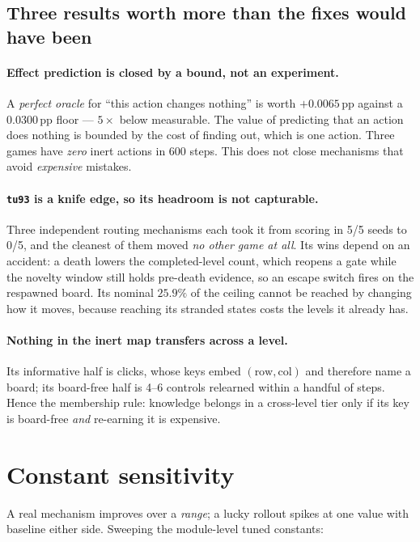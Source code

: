 \documentclass[11pt,a4paper]{article}
\newcommand{\pp}{\,\text{pp}}
\begin{document}
\subsection{Three results worth more than the fixes would have been}

\paragraph{Effect prediction is closed by a bound, not an experiment.}
A \emph{perfect oracle} for ``this action changes nothing'' is worth
$+0.0065\pp$ against a $0.0300\pp$ floor --- $5\times$ below measurable. The value of
predicting that an action does nothing is bounded by the cost of finding out, which is
one action. Three games have \emph{zero} inert actions in 600 steps. This does not close
mechanisms that avoid \emph{expensive} mistakes.

\paragraph{\texttt{tu93} is a knife edge, so its headroom is not capturable.}
Three independent routing mechanisms each took it from scoring in 5/5 seeds to 0/5, and
the cleanest of them moved \emph{no other game at all}. Its wins depend on an accident:
a death lowers the completed-level count, which reopens a gate while the novelty window
still holds pre-death evidence, so an escape switch fires on the respawned board. Its
nominal $25.9\%$ of the ceiling cannot be reached by changing how it moves, because
reaching its stranded states costs the levels it already has.

\paragraph{Nothing in the inert map transfers across a level.}
Its informative half is clicks, whose keys embed $(\text{row},\text{col})$ and therefore
name a board; its board-free half is 4--6 controls relearned within a handful of steps.
Hence the membership rule: knowledge belongs in a cross-level tier only if its key is
board-free \emph{and} re-earning it is expensive.

\section{Constant sensitivity}

A real mechanism improves over a \emph{range}; a lucky rollout spikes at one value with
baseline either side. Sweeping the module-level tuned constants:
\end{document}
